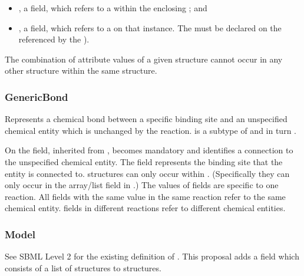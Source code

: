 \documentclass{cekarticle}
\begin{document}
\begin{itemize}

\item {}, a  field,
which refers to a  within the enclosing
; and

\item {}, a  field, which refers to a 
on that instance.  The  must be declared on the  referenced by the
).

\end{itemize}

The combination of attribute values of a given  structure cannot
occur in any other  structure within the same 
structure.  

\subsubsection{GenericBond}

Represents a chemical bond between a specific binding site and an unspecified chemical entity which is
unchanged by the reaction.
 is a subtype of  and in turn .

On  the  field, inherited from , becomes mandatory and
identifies a connection to the unspecified chemical entity.
The  field represents the binding site that the entity
is connected to.
 structures can only occur within .
(Specifically they can only occur
in the  array/list field in .)
The values of   fields are specific to one reaction. 
All  
fields with the same value in the same reaction refer to the same chemical entity.
  fields in different reactions refer to different chemical entities.

\subsubsection{Model}

See SBML Level 2 for the existing definition of .  This proposal adds a
 field which consists of a list of  structures to
 structures.  
\end{document}

